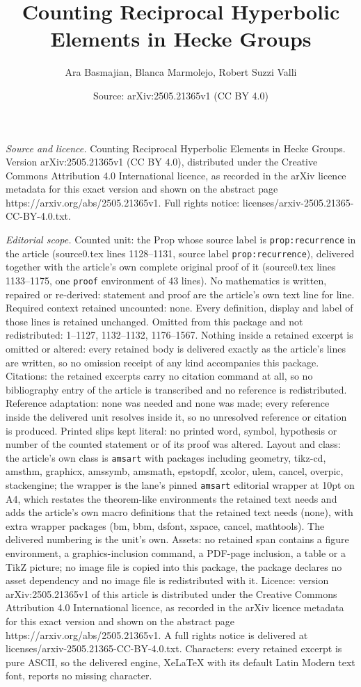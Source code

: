 \documentclass[10pt,a4paper]{amsart}
\title[Counting Reciprocal Hyperbolic Elements in Hecke Groups]{Counting Reciprocal Hyperbolic Elements in Hecke Groups}
\author{Ara Basmajian, Blanca Marmolejo, Robert Suzzi Valli}
\date{Source: arXiv:2505.21365v1 (CC BY 4.0)}
\begin{document}
\maketitle

\noindent\emph{Source and licence.} Counting Reciprocal Hyperbolic Elements in Hecke Groups. Version arXiv:2505.21365v1 (CC BY 4.0), distributed under the Creative Commons Attribution 4.0 International licence, as recorded in the arXiv licence metadata for this exact version and shown on the abstract page https://arxiv.org/abs/2505.21365v1. Full rights notice: licenses/arxiv-2505.21365-CC-BY-4.0.txt.\par\smallskip

\noindent\textit{Editorial scope.} Counted unit: the Prop whose source label is \texttt{prop:recurrence} in the article (source0.tex lines 1128--1131, source label \texttt{prop:recurrence}), delivered together with the article's own complete original proof of it (source0.tex lines 1133--1175, one \texttt{proof} environment of 43 lines). No mathematics is written, repaired or re-derived: statement and proof are the article's own text line for line. Required context retained uncounted: none. Every definition, display and label of those lines is retained unchanged. Omitted from this package and not redistributed: 1--1127, 1132--1132, 1176--1567. Nothing inside a retained excerpt is omitted or altered: every retained body is delivered exactly as the article's lines are written, so no omission receipt of any kind accompanies this package. Citations: the retained excerpts carry no citation command at all, so no bibliography entry of the article is transcribed and no reference is redistributed. Reference adaptation: none was needed and none was made; every reference inside the delivered unit resolves inside it, so no unresolved reference or citation is produced. Printed slips kept literal: no printed word, symbol, hypothesis or number of the counted statement or of its proof was altered. Layout and class: the article's own class is \texttt{amsart} with packages including geometry, tikz-cd, amsthm, graphicx, amssymb, amsmath, epstopdf, xcolor, ulem, cancel, overpic, stackengine; the wrapper is the lane's pinned \texttt{amsart} editorial wrapper at 10pt on A4, which restates the theorem-like environments the retained text needs and adds the article's own macro definitions that the retained text needs (none), with extra wrapper packages (bm, bbm, dsfont, xspace, cancel, mathtools). The delivered numbering is the unit's own. Assets: no retained span contains a figure environment, a graphics-inclusion command, a PDF-page inclusion, a table or a TikZ picture; no image file is copied into this package, the package declares no asset dependency and no image file is redistributed with it. Licence: version arXiv:2505.21365v1 of this article is distributed under the Creative Commons Attribution 4.0 International licence, as recorded in the arXiv licence metadata for this exact version and shown on the abstract page https://arxiv.org/abs/2505.21365v1. A full rights notice is delivered at licenses/arxiv-2505.21365-CC-BY-4.0.txt. Characters: every retained excerpt is pure ASCII, so the delivered engine, XeLaTeX with its default Latin Modern text font, reports no missing character.
\end{document}

